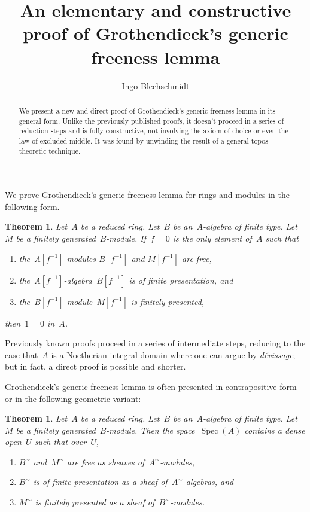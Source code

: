 \documentclass{amsart}
\title{An elementary and constructive proof of Grothendieck's generic freeness
lemma}
\author{Ingo Blechschmidt}
\theoremstyle{definition}
\theoremstyle{plain}
\newtheorem{thm}[defn]{Theorem}
\theoremstyle{remark}
\DeclareMathOperator{\Spec}{Spec}
\begin{document}
\begin{abstract}
  We present a new and direct proof of Grothendieck's generic freeness
  lemma in its general form. Unlike the previously published proofs, it doesn't
  proceed in a series of reduction steps and is fully constructive, not
  involving the axiom of choice or even the law of excluded middle. It was
  found by unwinding the result of a general topos-theoretic technique.
\end{abstract}

\maketitle

We prove Grothendieck's generic freeness lemma for rings and modules in the
following form.

\begin{thm}\label{thm:algebraic}Let~$A$ be a reduced ring. Let~$B$ be
an~$A$-algebra of finite type. Let~$M$ be a finitely generated~$B$-module.
If~$f = 0$ is the only element of~$A$ such that
\begin{enumerate}
\item the~$A[f^{-1}]$-modules $B[f^{-1}]$ and $M[f^{-1}]$ are free,
\item the~$A[f^{-1}]$-algebra~$B[f^{-1}]$ is of finite presentation, and
\item the~$B[f^{-1}]$-module~$M[f^{-1}]$ is finitely presented,
\end{enumerate}
then~$1 = 0$ in~$A$.
\end{thm}

Previously known proofs proceed in a series of intermediate steps, reducing
to the case that~$A$ is a Noetherian integral domain where one can argue by
\emph{dévissage}; but in fact, a direct proof is possible and shorter.

Grothendieck's generic freeness lemma is often presented in contrapositive form
or in the following geometric variant:

\begin{thm}\label{thm:geometric}Let~$A$ be a reduced ring. Let~$B$ be
an~$A$-algebra of finite type. Let~$M$ be a finitely generated~$B$-module. Then
the space~$\Spec(A)$ contains a dense open~$U$ such that over~$U$,
\begin{enumerate}
\item[(a)] $B^\sim$ and~$M^\sim$ are free as sheaves of~$A^\sim$-modules,
\item[(b)] $B^\sim$ is of finite presentation as a sheaf of~$A^\sim$-algebras, and
\item[(c)] $M^\sim$ is finitely presented as a sheaf of~$B^\sim$-modules.
\end{enumerate}
\end{thm}
\end{document}
